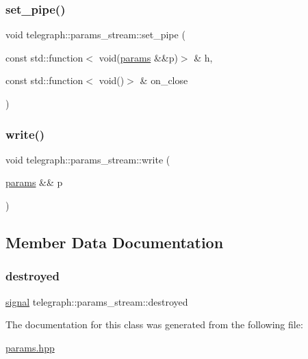 \subsubsection{\texorpdfstring{set\+\_\+pipe()}{set\_pipe()}}
{\footnotesize\ttfamily void telegraph\+::params\+\_\+stream\+::set\+\_\+pipe (\begin{DoxyParamCaption}\item[{const std\+::function$<$ void(\hyperlink{classtelegraph_1_1params}{params} \&\&p)$>$ \&}]{h,  }\item[{const std\+::function$<$ void()$>$ \&}]{on\+\_\+close }\end{DoxyParamCaption})\hspace{0.3cm}{\ttfamily [inline]}}

\mbox{\label{classtelegraph_1_1params__stream_a64e27e3048892b53eecf3826505945b5}} 
\subsubsection{\texorpdfstring{write()}{write()}}
{\footnotesize\ttfamily void telegraph\+::params\+\_\+stream\+::write (\begin{DoxyParamCaption}\item[{\hyperlink{classtelegraph_1_1params}{params} \&\&}]{p }\end{DoxyParamCaption})\hspace{0.3cm}{\ttfamily [inline]}}



\subsection{Member Data Documentation}
\mbox{\label{classtelegraph_1_1params__stream_a248d6dacec53ba9f8c20ec04aaa299d0}} 
\subsubsection{\texorpdfstring{destroyed}{destroyed}}
{\footnotesize\ttfamily \hyperlink{classtelegraph_1_1signal}{signal} telegraph\+::params\+\_\+stream\+::destroyed}



The documentation for this class was generated from the following file\+:\begin{DoxyCompactItemize}
\item 
\hyperlink{params_8hpp}{params.\+hpp}\end{DoxyCompactItemize}
